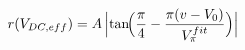 \documentclass[border=1pt]{standalone}
\begin{document}
\fontsize{14}{16.8}\selectfont
\(\displaystyle r(V_{DC,eff}) = A\,\Bigl|\tan\!\Bigl(\frac{\pi}{4} - \frac{\pi(v-V_0)}{V_\pi^{fit}}\Bigr)\Bigr|\)
\end{document}
